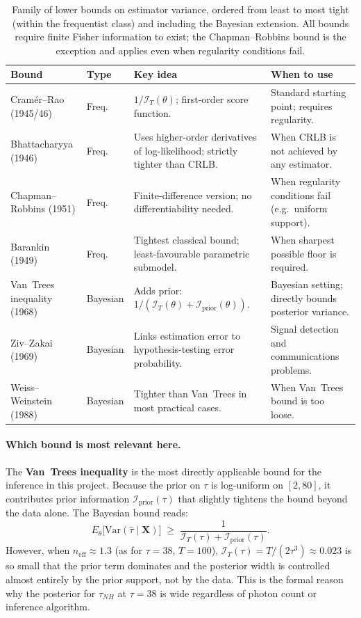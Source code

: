 \documentclass[11pt, a4paper]{article}
\begin{document}
\begin{table}[h]
\centering
\caption{Family of lower bounds on estimator variance, ordered from least to
most tight (within the frequentist class) and including the Bayesian extension.
All bounds require finite Fisher information to exist; the Chapman--Robbins bound
is the exception and applies even when regularity conditions fail.}
\label{tab:bounds_family}
\renewcommand{\arraystretch}{1.5}
\begin{tabular}{p{3.8cm} p{1.6cm} p{4.8cm} p{3.2cm}}
\hline
\textbf{Bound} & \textbf{Type} & \textbf{Key idea} & \textbf{When to use} \\
\hline
Cram\'er--Rao (1945/46) &
Freq. &
$1/\mathcal{I}_T(\theta)$; first-order score function. &
Standard starting point; requires regularity. \\
Bhattacharyya (1946) &
Freq. &
Uses higher-order derivatives of log-likelihood; strictly tighter than CRLB. &
When CRLB is not achieved by any estimator. \\
Chapman--Robbins (1951) &
Freq. &
Finite-difference version; no differentiability needed. &
When regularity conditions fail (e.g.\ uniform support). \\
Barankin (1949) &
Freq. &
Tightest classical bound; least-favourable parametric submodel. &
When sharpest possible floor is required. \\
Van~Trees inequality (1968) &
Bayesian &
Adds prior: $1/(\mathcal{I}_T(\theta)+\mathcal{I}_\mathrm{prior}(\theta))$. &
Bayesian setting; directly bounds posterior variance. \\
Ziv--Zakai (1969) &
Bayesian &
Links estimation error to hypothesis-testing error probability. &
Signal detection and communications problems. \\
Weiss--Weinstein (1988) &
Bayesian &
Tighter than Van~Trees in most practical cases. &
When Van~Trees bound is too loose. \\
\hline
\end{tabular}
\end{table}

\paragraph{Which bound is most relevant here.}
The \textbf{Van~Trees inequality} is the most directly applicable bound for the
inference in this project.
Because the prior on $\tau$ is log-uniform on $[2, 80]$, it contributes prior
information $\mathcal{I}_\mathrm{prior}(\tau)$ that slightly tightens the bound
beyond the data alone.
The Bayesian bound reads:
\begin{equation}
    E_\theta\bigl[\mathrm{Var}(\hat\tau \mid \mathbf{X})\bigr]
    \;\geq\;
    \frac{1}{\mathcal{I}_T(\tau) + \mathcal{I}_\mathrm{prior}(\tau)}.
\end{equation}
However, when $n_\mathrm{eff} \approx 1.3$ (as for $\tau=38$, $T=100$),
$\mathcal{I}_T(\tau) = T/(2\tau^3) \approx 0.023$ is so small that the prior
term dominates and the posterior width is controlled almost entirely by the
prior support, not by the data.
This is the formal reason why the posterior for $\tau_{NH}$ at $\tau=38$ is wide
regardless of photon count or inference algorithm.
\end{document}
